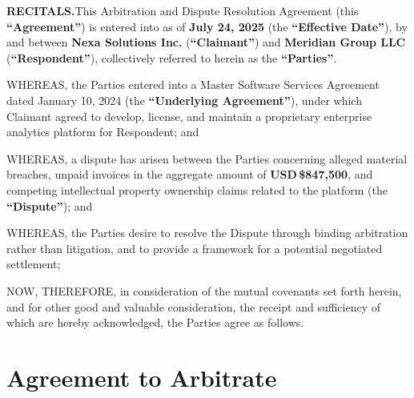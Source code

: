 \documentclass[11pt,a4paper]{article}
\begin{document}
\noindent
\begin{tcolorbox}[clausebox]
  \sffamily\small{}
  \textbf{RECITALS.}\quad This Arbitration and Dispute Resolution Agreement (this
  \textbf{``Agreement''}) is entered into as of \textbf{July 24, 2025} (the
  \textbf{``Effective Date''}), by and between \textbf{Nexa Solutions Inc.}
  (\textbf{``Claimant''}) and \textbf{Meridian Group LLC} (\textbf{``Respondent''}),
  collectively referred to herein as the \textbf{``Parties''}.

  \vspace{4pt}
  WHEREAS, the Parties entered into a Master Software Services Agreement dated
  January 10, 2024 (the \textbf{``Underlying Agreement''}), under which Claimant
  agreed to develop, license, and maintain a proprietary enterprise analytics platform
  for Respondent; and

  \vspace{4pt}
  WHEREAS, a dispute has arisen between the Parties concerning alleged material
  breaches, unpaid invoices in the aggregate amount of \textbf{USD\,\$847,500},
  and competing intellectual property ownership claims related to the platform
  (the \textbf{``Dispute''}); and

  \vspace{4pt}
  WHEREAS, the Parties desire to resolve the Dispute through binding arbitration
  rather than litigation, and to provide a framework for a potential negotiated
  settlement;

  \vspace{4pt}
  NOW, THEREFORE, in consideration of the mutual covenants set forth herein, and
  for other good and valuable consideration, the receipt and sufficiency of which
  are hereby acknowledged, the Parties agree as follows.
\end{tcolorbox}

\section{Agreement to Arbitrate}
\end{document}

